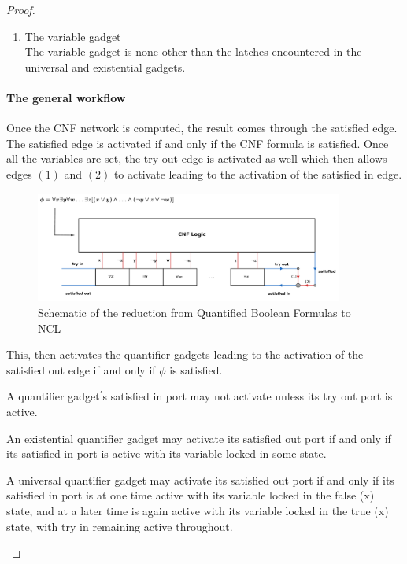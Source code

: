\begin{proof}
\begin{enumerate}
    \item The variable gadget \\
    The variable gadget is none other than the latches encountered in the universal and existential gadgets.
\end{enumerate}

\paragraph{The general workflow} \hfill \break

Once the CNF network is computed, the result comes through the satisfied edge. The satisfied edge is activated if and only if the CNF formula is satisfied. 
Once all the variables are set, the try out edge is activated as well which then allows edges $(1)$ and $(2)$ to activate leading to the activation of the satisfied in edge. 
   
    \begin{figure}[H]
    \centering
    \includegraphics[width=0.9\textwidth]{res/NCL1.pdf}
    \caption{Schematic of the reduction from Quantified Boolean Formulas to NCL}
    \label{fig:circle}
    \end{figure}
    
This, then activates the quantifier gadgets leading to the activation of the satisfied out edge if and only if $\phi$ is satisfied.   

\begin{lemma}\cite{goos_nondeterministic_2002}
A quantifier gadget${^'}$s satisfied in port may not activate unless its try out port is active.
\end{lemma}

\begin{lemma}\cite{goos_nondeterministic_2002}
An existential quantifier gadget may activate its satisfied out port if and only if its satisfied in port is active with its variable locked in some state.
\end{lemma}

\begin{lemma} \cite{goos_nondeterministic_2002}
A universal quantifier gadget may activate its satisfied out port if and only if its satisfied in port is at one time active with its variable locked in the false (x) state, and at a later time is again active with its variable locked in
the true (x) state, with try in remaining active throughout.
\end{lemma}


\end{proof}
